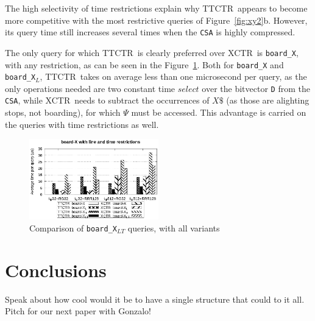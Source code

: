 \documentclass[runningheads]{llncs}
\newcommand{\ctr}{XCTR}
\newcommand{\ttctr}{TTCTR}
\begin{document}
The high selectivity of time restrictions explain why \ttctr~appears to become more competitive with the most restrictive queries of Figure~\ref{fig:xy2}b. However, its query time still increases several times when the \texttt{CSA} is highly compressed.

The only query for which \ttctr~is clearly preferred over \ctr~is \texttt{board\_X}, with any restriction, as can be seen in the Figure~\ref{fig:board}. Both for \texttt{board\_X} and \texttt{board\_X$_{L}$}, \ttctr~takes on average less than one microsecond per query, as the only operations needed are two constant time $select$ over the bitvector \texttt{D} from the \texttt{CSA}, while \ctr~needs to subtract the occurrences of $X\$$ (as those are alighting stops, not boarding), for which $\Psi$ must be accessed. This advantage is carried on the queries with time restrictions as well.

\begin{figure}[hbt!]
\includegraphics[width=0.5\textwidth]{experiments/board.eps}
\caption{Comparison of \texttt{board\_X$_{LT}$} queries, with all variants}
\label{fig:board}
\end{figure}

\section{Conclusions}
Speak about how cool would it be to have a single structure that could to it all. Pitch for our next paper with Gonzalo!

%
%





\end{document}
